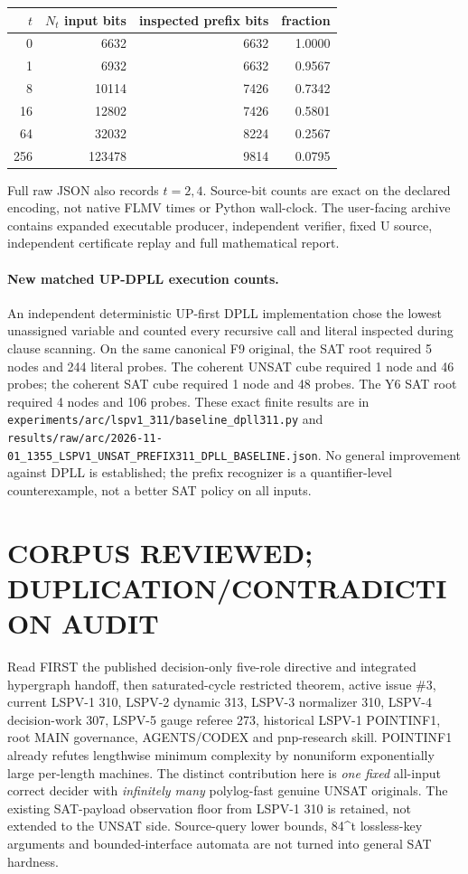 \documentclass[11pt]{article}
\begin{document}
\begin{center}\begin{tabular}{rrrr}\toprule
$t$ & $N_t$ input bits & inspected prefix bits & fraction\\\midrule
0&6632&6632&1.0000\\
1&6932&6632&0.9567\\
8&10114&7426&0.7342\\
16&12802&7426&0.5801\\
64&32032&8224&0.2567\\
256&123478&9814&0.0795\\\bottomrule
\end{tabular}\end{center}
Full raw JSON also records $t=2,4$. Source-bit counts are exact on
the declared encoding, not native FLMV times or Python wall-clock.
The user-facing archive contains expanded executable producer,
independent verifier, fixed U source, independent certificate replay
and full mathematical report.

\paragraph{New matched UP-DPLL execution counts.}
An independent deterministic UP-first DPLL implementation chose the lowest
unassigned variable and counted every recursive call and literal inspected
during clause scanning. On the same canonical F9 original, the SAT root
required 5 nodes and 244 literal probes. The coherent UNSAT cube required
1 node and 46 probes; the coherent SAT cube required 1 node and 48 probes.
The Y6 SAT root required 4 nodes and 106 probes. These exact finite results
are in \texttt{experiments/arc/lspv1\_311/baseline\_dpll311.py}
and \texttt{results/raw/arc/2026-11-01\_1355\_LSPV1\_UNSAT\_PREFIX311\_DPLL\_BASELINE.json}.
No general improvement against DPLL is established; the prefix recognizer
is a quantifier-level counterexample, not a better SAT policy on all inputs.

\section{CORPUS REVIEWED; DUPLICATION/CONTRADICTION AUDIT}
Read FIRST the published decision-only five-role directive and integrated
hypergraph handoff, then saturated-cycle restricted theorem, active
issue \#3, current LSPV-1 310, LSPV-2 dynamic 313,
LSPV-3 normalizer 310, LSPV-4 decision-work 307,
LSPV-5 gauge referee 273, historical LSPV-1 POINTINF1,
root MAIN governance, AGENTS/CODEX and pnp-research skill.
POINTINF1 already refutes lengthwise minimum complexity by
nonuniform exponentially large per-length machines. The distinct
contribution here is \emph{one fixed} all-input correct decider with
\emph{infinitely many} polylog-fast genuine UNSAT originals. The existing
SAT-payload observation floor from LSPV-1 310 is retained, not extended
to the UNSAT side. Source-query lower bounds, 84^t lossless-key
arguments and bounded-interface automata are not turned into general
SAT hardness.
\end{document}
